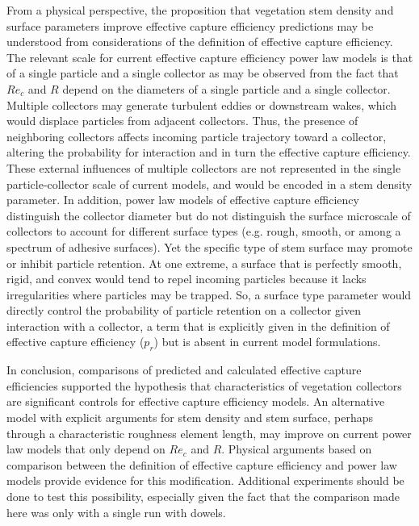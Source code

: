 \documentclass[12pt]{article}
\begin{document}
From a physical perspective, the proposition that vegetation stem density and surface parameters improve effective capture efficiency predictions may be understood from considerations of the definition of effective capture efficiency. The relevant scale for current effective capture efficiency power law models is that of a single particle and a single collector as may be observed from the fact that $Re_c$ and $R$ depend on the diameters of a single particle and a single collector. Multiple collectors may generate turbulent eddies or downstream wakes, which would displace particles from adjacent collectors. Thus, the presence of neighboring collectors affects incoming particle trajectory toward a collector, altering the probability for interaction and in turn the effective capture efficiency. These external influences of multiple collectors are not represented in the single particle-collector scale of current models, and would be encoded in a stem density parameter. In addition, power law models of effective capture efficiency distinguish the collector diameter but do not distinguish the surface microscale of collectors to account for different surface types (e.g. rough, smooth, or among a spectrum of adhesive surfaces). Yet the specific type of stem surface may promote or inhibit particle retention. At one extreme, a surface that is perfectly smooth, rigid, and convex would tend to repel incoming particles because it lacks irregularities where particles may be trapped. So, a surface type parameter would directly control the probability of particle retention on a collector given interaction with a collector, a term that is explicitly given in the definition of effective capture efficiency ($p_r$) but is absent in current model formulations.

In conclusion, comparisons of predicted and calculated effective capture efficiencies supported the hypothesis that characteristics of vegetation collectors are significant controls for effective capture efficiency models. An alternative model with explicit arguments for stem density and stem surface, perhaps through a characteristic roughness element length, may improve on current power law models that only depend on $Re_c$ and $R$. Physical arguments based on comparison between the definition of effective capture efficiency and power law models provide evidence for this modification. Additional experiments should be done to test this possibility, especially given the fact that the comparison made here was only with a single run with dowels.
\end{document}
